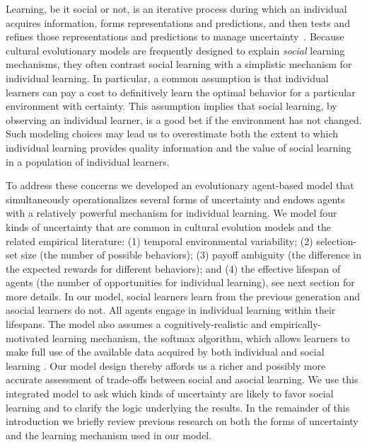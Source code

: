 \documentclass[letterpaper,11.5pt]{scrartcl}
\begin{document}
Learning, be it social or not, is an iterative process during which an individual acquires information, forms representations and predictions, and then tests and refines those representations and predictions to manage uncertainty~\citep{jacobs2011bayesian,clark2013whatever}. Because cultural evolutionary models are frequently designed to explain \emph{social} learning mechanisms, they often contrast social learning with a simplistic mechanism for individual learning. In particular, a common assumption is that individual learners can pay a cost to definitively learn the optimal behavior for a particular environment with certainty. This assumption implies that social learning, by observing an individual learner, is a good bet if the environment has not changed. Such modeling choices may lead us to overestimate both the extent to which individual learning provides quality information and the value of social learning in a population of individual learners. %

To address these concerns we developed an evolutionary agent-based model that
simultaneously operationalizes several forms of uncertainty and endows agents
with a relatively powerful mechanism for individual learning. We model four kinds of
uncertainty that are common in cultural evolution models and the related empirical
literature:  (1) temporal environmental variability; (2) selection-set size (the number of possible behaviors); (3) payoff ambiguity
(the difference in the expected rewards for different behaviors); and (4) the effective lifespan of agents (the number of
opportunities for individual learning), see next section for more details. In our model, social learners learn from the previous
generation and asocial learners do not. All agents engage in individual learning within their lifespans. The model also assumes a
cognitively-realistic and empirically-motivated learning mechanism, the softmax algorithm, which allows learners to make full use of the available data acquired by both individual and social learning \citep{SuttonBartoBook}. Our model design thereby affords us a richer and possibly more accurate assessment of trade-offs between social and asocial learning. We use this integrated model to ask which kinds of uncertainty are likely to favor social learning and to clarify the logic underlying the results.
In the remainder of this introduction we briefly review previous research on both the forms of uncertainty and the learning mechanism used in our model. 
\end{document}
